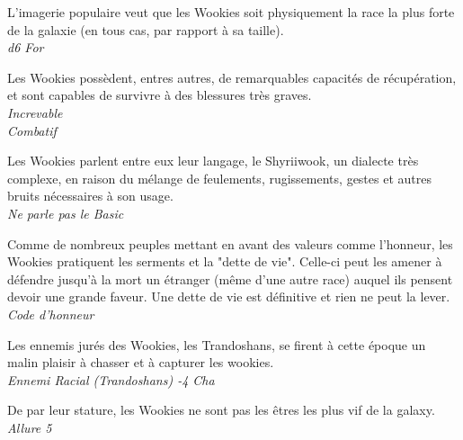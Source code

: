 \begin{description}[align=left]
\item [Force de la nature] 				%
	L'imagerie populaire veut que les Wookies soit physiquement la race la plus forte de la galaxie (en tous cas, par rapport à sa taille).\\
	\emph{d6 For}
\item [Increvable] 						%
	Les Wookies possèdent, entres autres, de remarquables capacités de récupération, et sont capables de survivre à des blessures très graves.\\
	\emph{Increvable}\\
	\emph{Combatif}
\item [Shyriiwook] 						%
	Les Wookies parlent entre eux leur langage, le Shyriiwook, un dialecte très complexe, en raison du mélange de feulements, rugissements, gestes et autres bruits nécessaires à son usage.\\
	\emph{Ne parle pas le Basic}
\item [Force \& Honneur] 				%
	Comme de nombreux peuples mettant en avant des valeurs comme l'honneur, les Wookies pratiquent les serments et la "dette de vie". Celle-ci peut les amener à défendre jusqu'à la mort un étranger (même d'une autre race) auquel ils pensent devoir une grande faveur. Une dette de vie est définitive et rien ne peut la lever.\\
	\emph{Code d'honneur}
\item [Ennemis jurés] 					%
	Les ennemis jurés des Wookies, les Trandoshans, se firent à cette époque un malin plaisir à chasser et à capturer les wookies.\\
	\emph{Ennemi Racial (Trandoshans) -4 Cha}
\item [Il faut partir à point] 			%
	De par leur stature, les Wookies ne sont pas les êtres les plus vif de la galaxy.\\
	\emph{Allure 5}
\end{description}